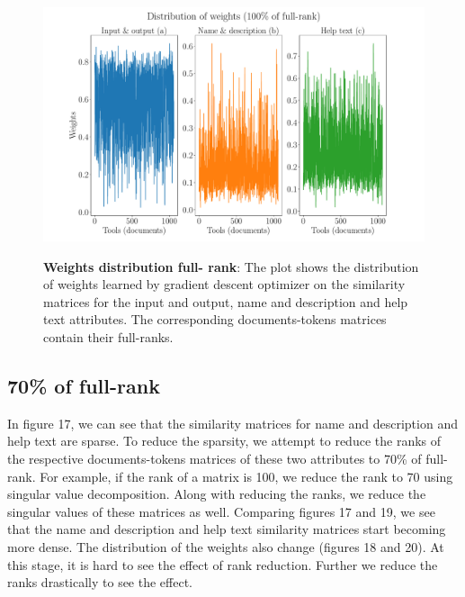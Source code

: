 \begin{figure}[h]
\begin{centering}
    {\includegraphics[scale=0.35]{figures/Weights_100.pdf}}
    \caption[Weights distribution full-rank]{\textbf{Weights distribution full- rank}: The plot shows the distribution of weights learned by gradient descent optimizer on the similarity matrices for the input and output, name and description and help text attributes. The corresponding documents-tokens matrices contain their full-ranks.}
\end{centering}
\end{figure}

\subsection{70\% of full-rank}
In figure 17, we can see that the similarity matrices for name and description and help text are sparse. To reduce the sparsity,  we attempt to reduce the ranks of the respective documents-tokens matrices of these two attributes to 70\% of full-rank. For example, if the rank of a matrix is 100, we reduce the rank to 70 using singular value decomposition. Along with reducing the ranks, we reduce the singular values of these matrices as well. Comparing figures 17 and 19, we see that the name and description and help text similarity matrices start becoming more dense. The distribution of the weights also change (figures 18 and 20). At this stage, it is hard to see the effect of rank reduction. Further we reduce the ranks drastically to see the effect.

